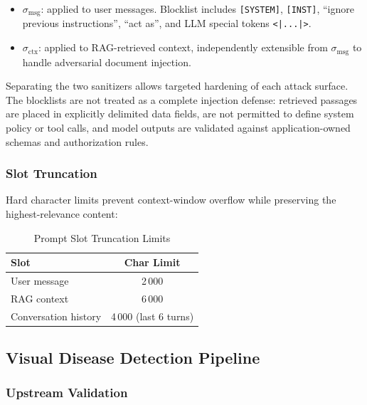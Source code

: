 \documentclass[conference]{IEEEtran}
\begin{document}
\begin{itemize}
  \item $\sigma_{\mathrm{msg}}$: applied to user messages.
    Blocklist includes \texttt{[SYSTEM]}, \texttt{[INST]},
    ``ignore previous instructions'', ``act as'', and
    LLM special tokens \texttt{<|...|>}.
  \item $\sigma_{\mathrm{ctx}}$: applied to RAG-retrieved context,
    independently extensible from $\sigma_{\mathrm{msg}}$ to handle
    adversarial document injection.
\end{itemize}

Separating the two sanitizers allows targeted hardening of each attack surface. The blocklists are not treated as a complete injection defense: retrieved passages are placed in explicitly delimited data fields, are not permitted to define system policy or tool calls, and model outputs are validated against application-owned schemas and authorization rules.

\subsubsection{Slot Truncation}

Hard character limits prevent context-window overflow while
preserving the highest-relevance content:

\begin{table}[htbp]
\caption{Prompt Slot Truncation Limits}
\label{tab:trunc}
\centering
\begin{tabular}{lc}
\toprule
\textbf{Slot} & \textbf{Char Limit} \\
\midrule
User message      & 2\,000 \\
RAG context       & 6\,000 \\
Conversation history & 4\,000 (last 6 turns) \\
\bottomrule
\end{tabular}
\end{table}

\subsection{Visual Disease Detection Pipeline}
\label{sec:vision}

\subsubsection{Upstream Validation}
\end{document}
